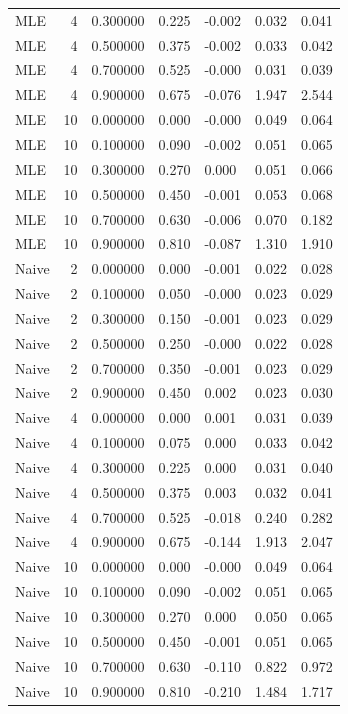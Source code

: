 \begin{tabular}{lrrllll}
MLE & 4 & 0.300000 & 0.225 & -0.002 & 0.032 & 0.041 \\
MLE & 4 & 0.500000 & 0.375 & -0.002 & 0.033 & 0.042 \\
MLE & 4 & 0.700000 & 0.525 & -0.000 & 0.031 & 0.039 \\
MLE & 4 & 0.900000 & 0.675 & -0.076 & 1.947 & 2.544 \\
MLE & 10 & 0.000000 & 0.000 & -0.000 & 0.049 & 0.064 \\
MLE & 10 & 0.100000 & 0.090 & -0.002 & 0.051 & 0.065 \\
MLE & 10 & 0.300000 & 0.270 & 0.000 & 0.051 & 0.066 \\
MLE & 10 & 0.500000 & 0.450 & -0.001 & 0.053 & 0.068 \\
MLE & 10 & 0.700000 & 0.630 & -0.006 & 0.070 & 0.182 \\
MLE & 10 & 0.900000 & 0.810 & -0.087 & 1.310 & 1.910 \\
Naive & 2 & 0.000000 & 0.000 & -0.001 & 0.022 & 0.028 \\
Naive & 2 & 0.100000 & 0.050 & -0.000 & 0.023 & 0.029 \\
Naive & 2 & 0.300000 & 0.150 & -0.001 & 0.023 & 0.029 \\
Naive & 2 & 0.500000 & 0.250 & -0.000 & 0.022 & 0.028 \\
Naive & 2 & 0.700000 & 0.350 & -0.001 & 0.023 & 0.029 \\
Naive & 2 & 0.900000 & 0.450 & 0.002 & 0.023 & 0.030 \\
Naive & 4 & 0.000000 & 0.000 & 0.001 & 0.031 & 0.039 \\
Naive & 4 & 0.100000 & 0.075 & 0.000 & 0.033 & 0.042 \\
Naive & 4 & 0.300000 & 0.225 & 0.000 & 0.031 & 0.040 \\
Naive & 4 & 0.500000 & 0.375 & 0.003 & 0.032 & 0.041 \\
Naive & 4 & 0.700000 & 0.525 & -0.018 & 0.240 & 0.282 \\
Naive & 4 & 0.900000 & 0.675 & -0.144 & 1.913 & 2.047 \\
Naive & 10 & 0.000000 & 0.000 & -0.000 & 0.049 & 0.064 \\
Naive & 10 & 0.100000 & 0.090 & -0.002 & 0.051 & 0.065 \\
Naive & 10 & 0.300000 & 0.270 & 0.000 & 0.050 & 0.065 \\
Naive & 10 & 0.500000 & 0.450 & -0.001 & 0.051 & 0.065 \\
Naive & 10 & 0.700000 & 0.630 & -0.110 & 0.822 & 0.972 \\
Naive & 10 & 0.900000 & 0.810 & -0.210 & 1.484 & 1.717 \\
\bottomrule
\end{tabular}
